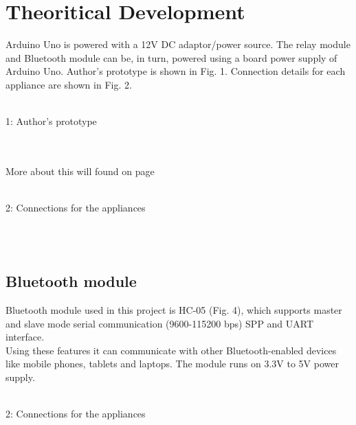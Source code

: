\documentclass[10pt]{article}
\begin{document}
	\section{Theoritical Development}\label{sec:TD}
	 Arduino Uno is powered with a 12V DC adaptor/power source. The relay module and Bluetooth module can be, in turn, powered using a board power supply of Arduino Uno. Author’s prototype is shown in Fig. 1. Connection details for each appliance are shown in Fig. 2.\\[0.5 cm]\\
	\begin{minipage}{0.3\textwidth}	
		\figurename{1: Author’s prototype}
	\end{minipage}\\[0.3 cm]\\
More about this will found on page\pageref{sec:intro}\\[0.3 cm]\\
	\begin{minipage}{0.3\textwidth}	
	\figurename{2: Connections for the appliances}
\end{minipage}\\[0.3 cm]\\
	\subsection{Bluetooth module}
	
	Bluetooth module used in this project is HC-05 (Fig. 4), which supports master and slave mode serial communication (9600-115200 bps) SPP and UART interface.\\ Using these features it can communicate with other Bluetooth-enabled devices like mobile phones, tablets and laptops. The module runs on 3.3V to 5V power supply.\\[0.5 cm]\\
		\begin{minipage}{0.3\textwidth}	
		\figurename{2: Connections for the appliances}
	\end{minipage}\\[0.3 cm]\\
\end{document}
